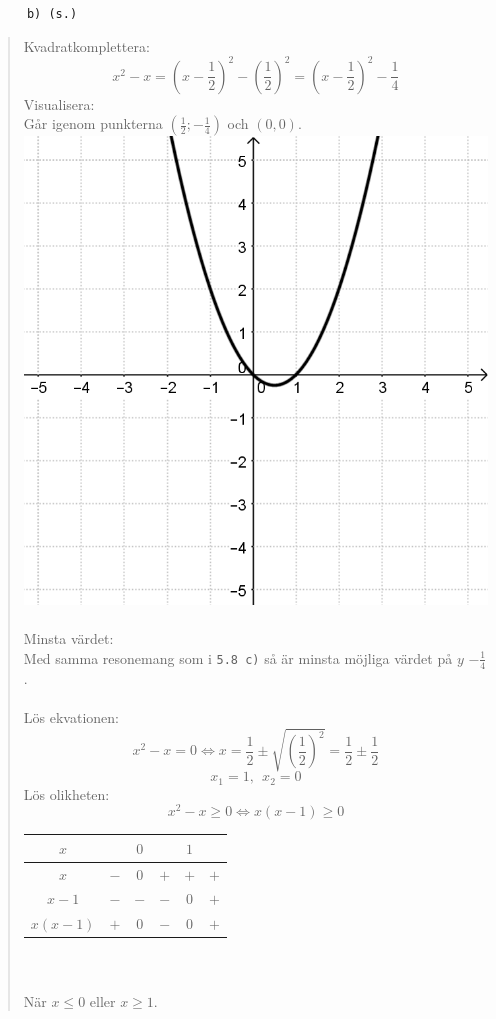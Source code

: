 \documentclass[a4paper]{article}
\newcommand{\tskcol}[1]{\textcolor{tskcol}{#1}}
\begin{document}
	\pagebreak
	\texttt{\tskcol{~~~~~~b) (s.)}}
	\begin{quotation}
		\noindent
		Kvadratkomplettera:
		\[x^2-x=(x-\frac{1}{2})^2-(\frac{1}{2})^2=(x-\frac{1}{2})^2-\frac{1}{4}\]
		Visualisera: \\
		Går igenom punkterna $(\frac{1}{2};-\frac{1}{4})$ och $(0,0)$. \\
		\includegraphics[scale=0.2]{images/59b.png} \\ \\
		Minsta värdet: \\
		Med samma resonemang som i \texttt{\tskcol{5.8 c)}} så är minsta möjliga värdet på $y$ $-\frac{1}{4}$. \\ \\
		Lös ekvationen:
		\[x^2-x=0 \Leftrightarrow
		x=\frac{1}{2}\pm\sqrt{(\frac{1}{2})^2}=\frac{1}{2}\pm\frac{1}{2}\]
		\[x_1=1,~~x_2=0\]
		Lös olikheten:
		\[x^2-x\ge0 \Leftrightarrow
		x(x-1)\ge0\]
		\begin{tabular}{c|c|c|c|c|c}
			$x$                     &     & $0$ &     & $1$ &     \\ \hline
			$x$                     & $-$ & $0$ & $+$ & $+$ & $+$ \\
			$x-1$                   & $-$ & $-$ & $-$ & $0$ & $+$ \\ \hline
			$x(x-1)$  		    	& $+$ & $0$ & $-$ & $0$ & $+$ \\
		\end{tabular} \\ \\
		När $x \le 0$ eller $x \ge 1$.
	\end{quotation}
	
\end{document}
